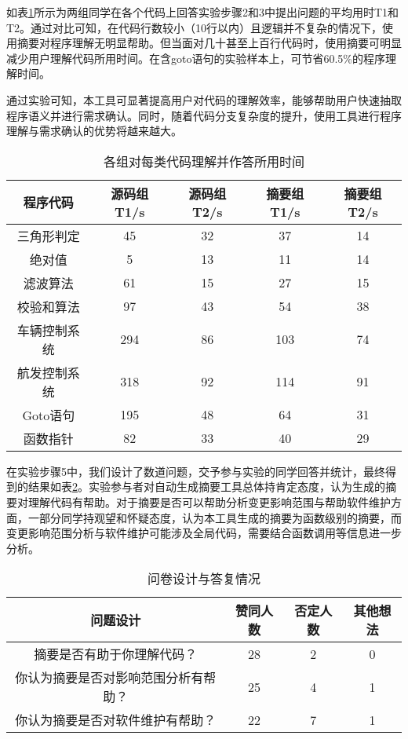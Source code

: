 如表\ref{tab:ComprehensionComparision}所示为两组同学在各个代码上回答实验步骤2和3中提出问题的平均用时T1和T2。通过对比可知，在代码行数较小（10行以内）且逻辑并不复杂的情况下，使用摘要对程序理解无明显帮助。但当面对几十甚至上百行代码时，使用摘要可明显减少用户理解代码所用时间。在含goto语句的实验样本上，可节省60.5\%的程序理解时间。

通过实验可知，本工具可显著提高用户对代码的理解效率，能够帮助用户快速抽取程序语义并进行需求确认。同时，随着代码分支复杂度的提升，使用工具进行程序理解与需求确认的优势将越来越大。

\begin{table}[htb]
	\centering
	\caption{各组对每类代码理解并作答所用时间}
	\label{tab:ComprehensionComparision}
	\begin{tabular}{|c|c|c|c|c|}
		\hline
		程序代码 & 源码组T1/s & 源码组T2/s & 摘要组T1/s & 摘要组T2/s \\ \hline
		三角形判定 & 45 & 32 & 37 & 14 \\ \hline
		绝对值 & 5 & 13 & 11 & 14 \\ \hline
		滤波算法 & 61 & 15 & 27 & 15 \\ \hline
		校验和算法 & 97 & 43 & 54 & 38 \\ \hline
		车辆控制系统 & 294 & 86 & 103 & 74 \\ \hline
		航发控制系统 & 318 & 92 & 114 & 91 \\ \hline
		Goto语句 & 195 & 48 & 64 & 31 \\ \hline
		函数指针 & 82 & 33 & 40 & 29 \\ \hline
	\end{tabular}
\end{table}

在实验步骤5中，我们设计了数道问题，交予参与实验的同学回答并统计，最终得到的结果如表\ref{tab:questionaire}。实验参与者对自动生成摘要工具总体持肯定态度，认为生成的摘要对理解代码有帮助。对于摘要是否可以帮助分析变更影响范围与帮助软件维护方面，一部分同学持观望和怀疑态度，认为本工具生成的摘要为函数级别的摘要，而变更影响范围分析与软件维护可能涉及全局代码，需要结合函数调用等信息进一步分析。

\begin{table}[htb]
	\centering
	\caption{问卷设计与答复情况}
	\label{tab:questionaire}
	\begin{tabular}{|c|c|c|c|}
		\hline
		问题设计 & 赞同人数 & 否定人数 & 其他想法 \\ \hline
		摘要是否有助于你理解代码？ & 28 & 2 & 0 \\ \hline
		你认为摘要是否对影响范围分析有帮助？ & 25 & 4 & 1 \\ \hline
		你认为摘要是否对软件维护有帮助？ & 22 & 7 & 1 \\ \hline
	\end{tabular}
\end{table}

